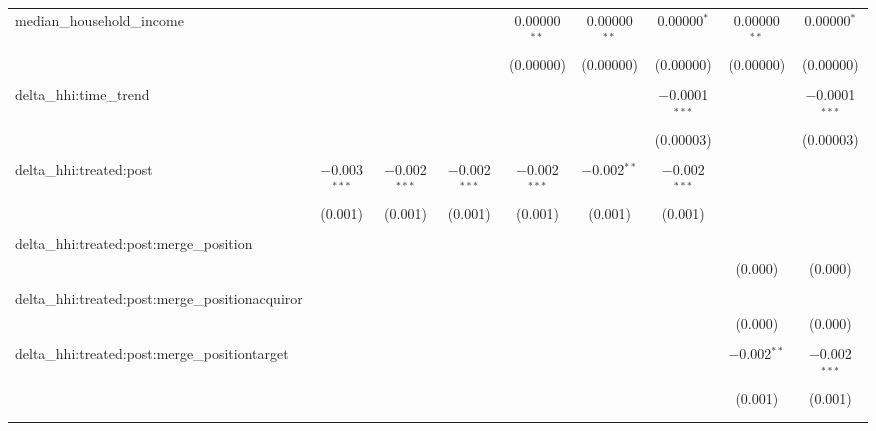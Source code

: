 \begin{table}[H]
{\begin{tabular}{@{\extracolsep{5pt}}lcccccccc}
  median\_household\_income &  &  &  & 0.00000$^{**}$ & 0.00000$^{**}$ & 0.00000$^{*}$ & 0.00000$^{**}$ & 0.00000$^{*}$ \\  

   &  &  &  & (0.00000) & (0.00000) & (0.00000) & (0.00000) & (0.00000) \\  

   & & & & & & & & \\  

  delta\_hhi:time\_trend &  &  &  &  &  & $-$0.0001$^{***}$ &  & $-$0.0001$^{***}$ \\  

   &  &  &  &  &  & (0.00003) &  & (0.00003) \\  

   & & & & & & & & \\  

  delta\_hhi:treated:post & $-$0.003$^{***}$ & $-$0.002$^{***}$ & $-$0.002$^{***}$ & $-$0.002$^{***}$ & $-$0.002$^{**}$ & $-$0.002$^{***}$ &  &  \\  

   & (0.001) & (0.001) & (0.001) & (0.001) & (0.001) & (0.001) &  &  \\  

   & & & & & & & & \\  

  delta\_hhi:treated:post:merge\_position &  &  &  &  &  &  &  &  \\  

   &  &  &  &  &  &  & (0.000) & (0.000) \\  

   & & & & & & & & \\  

  delta\_hhi:treated:post:merge\_positionacquiror &  &  &  &  &  &  &  &  \\  

   &  &  &  &  &  &  & (0.000) & (0.000) \\  

   & & & & & & & & \\  

  delta\_hhi:treated:post:merge\_positiontarget &  &  &  &  &  &  & $-$0.002$^{**}$ & $-$0.002$^{***}$ \\  

   &  &  &  &  &  &  & (0.001) & (0.001) \\  

   & & & & & & & & \\  

 \hline \\[-1.8ex]  


\end{tabular}}
\end{table}
